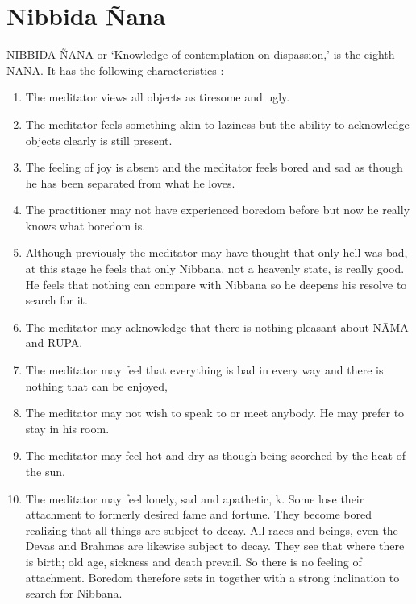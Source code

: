 \documentclass[a5paper,10pt,english]{book}
\begin{document}
\section{Nibbida Ñana}
\label{\detokenize{progress:nibbida-nana}}
\sphinxAtStartPar
NIBBIDA ÑANA or ‘Knowledge of contemplation on dispassion,’ is the eighth NANA. It has the following characteristics :\sphinxhyphen{}
\begin{enumerate}
%
\item {} 
\sphinxAtStartPar
The meditator views all objects as tiresome and ugly.

\item {} 
\sphinxAtStartPar
The meditator feels something akin to laziness but the ability to acknowledge objects clearly is still present.

\item {} 
\sphinxAtStartPar
The feeling of joy is absent and the meditator feels bored and sad as though he has been separated from what he loves.

\item {} 
\sphinxAtStartPar
The practitioner may not have experienced boredom before but now he really knows what boredom is.

\item {} 
\sphinxAtStartPar
Although previously the meditator may have thought that only hell was bad, at this stage he feels that only Nibbana, not a heavenly state, is really good. He feels that nothing can compare with Nibbana so he deepens his resolve to search for it.

\item {} 
\sphinxAtStartPar
The meditator may acknowledge that there is nothing pleasant about NĀMA and RUPA.

\item {} 
\sphinxAtStartPar
The meditator may feel that everything is bad in every way and there is nothing that can be enjoyed,

\item {} 
\sphinxAtStartPar
The meditator may not wish to speak to or meet anybody. He may prefer to stay in his room.

\item {} 
\sphinxAtStartPar
The meditator may feel hot and dry as though being scorched by the heat of the sun.

\item {} 
\sphinxAtStartPar
The meditator may feel lonely, sad and apathetic, k. Some lose their attachment to formerly desired fame and fortune. They become bored realizing that all things are subject to decay. All races and beings, even the Devas and Brahmas are likewise subject to decay. They see that where there is birth; old age, sickness and death prevail. So there is no feeling of attachment. Boredom therefore sets in together with a strong inclination to search for Nibbana.

\end{enumerate}
\end{document}
